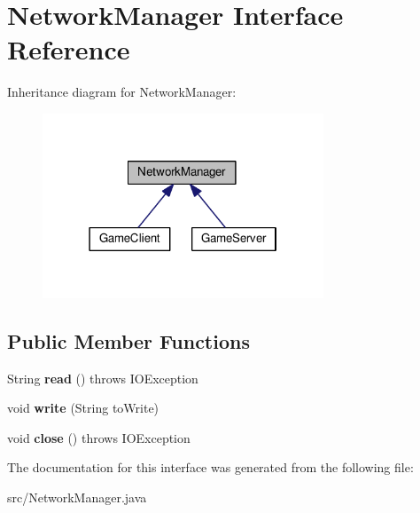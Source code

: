 \hypertarget{interfaceNetworkManager}{}\section{Network\+Manager Interface Reference}
\label{interfaceNetworkManager}


Inheritance diagram for Network\+Manager\+:
\nopagebreak
\begin{figure}[H]
\begin{center}
\leavevmode
\includegraphics[width=238pt]{interfaceNetworkManager__inherit__graph}
\end{center}
\end{figure}
\subsection*{Public Member Functions}
\begin{DoxyCompactItemize}
\item 
String {\bfseries read} ()  throws I\+O\+Exception\hypertarget{interfaceNetworkManager_a1770d9c0eba406494ffb1f7e9a86e05f}{}\label{interfaceNetworkManager_a1770d9c0eba406494ffb1f7e9a86e05f}

\item 
void {\bfseries write} (String to\+Write)\hypertarget{interfaceNetworkManager_a3c292bfd3d98fa5d04a14c493b8f14b0}{}\label{interfaceNetworkManager_a3c292bfd3d98fa5d04a14c493b8f14b0}

\item 
void {\bfseries close} ()  throws I\+O\+Exception\hypertarget{interfaceNetworkManager_a33643bfa896c4b9d0050ef0aa79ac16d}{}\label{interfaceNetworkManager_a33643bfa896c4b9d0050ef0aa79ac16d}

\end{DoxyCompactItemize}


The documentation for this interface was generated from the following file\+:\begin{DoxyCompactItemize}
\item 
src/Network\+Manager.\+java\end{DoxyCompactItemize}
